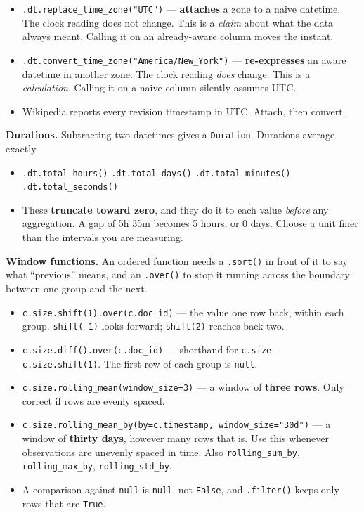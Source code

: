 \documentclass[11pt, a4paper]{article}
\newcommand{\code}[1]{\texttt{#1}}
\begin{document}
\begin{itemize}
  \item \code{.dt.replace\_time\_zone("UTC")} --- \textbf{attaches} a zone to a naive
        datetime. The clock reading does not change. This is a \textit{claim} about what the
        data always meant. Calling it on an already-aware column moves the instant.
  \item \code{.dt.convert\_time\_zone("America/New\_York")} --- \textbf{re-expresses} an aware
        datetime in another zone. The clock reading \textit{does} change. This is a
        \textit{calculation}. Calling it on a naive column silently assumes UTC.
  \item Wikipedia reports every revision timestamp in UTC. Attach, then convert.
\end{itemize}

\smallskip

\textbf{Durations.}
Subtracting two datetimes gives a \code{Duration}. Durations average exactly.

\begin{itemize}
  \item \code{.dt.total\_hours()} \quad \code{.dt.total\_days()} \quad
        \code{.dt.total\_minutes()} \quad \code{.dt.total\_seconds()}
  \item These \textbf{truncate toward zero}, and they do it to each value \textit{before} any
        aggregation. A gap of 5h 35m becomes 5 hours, or 0 days. Choose a unit finer than the
        intervals you are measuring.
\end{itemize}

\textbf{Window functions.}
An ordered function needs a \code{.sort()} in front of it to say what ``previous'' means, and
an \code{.over()} to stop it running across the boundary between one group and the next.

\begin{itemize}
  \item \code{c.size.shift(1).over(c.doc\_id)} --- the value one row back, within each group.
        \code{shift(-1)} looks forward; \code{shift(2)} reaches back two.
  \item \code{c.size.diff().over(c.doc\_id)} --- shorthand for \code{c.size - c.size.shift(1)}.
        The first row of each group is \code{null}.
  \item \code{c.size.rolling\_mean(window\_size=3)} --- a window of \textbf{three rows}. Only
        correct if rows are evenly spaced.
  \item \code{c.size.rolling\_mean\_by(by=c.timestamp, window\_size="30d")} --- a window of
        \textbf{thirty days}, however many rows that is. Use this whenever observations are
        unevenly spaced in time. Also \code{rolling\_sum\_by}, \code{rolling\_max\_by},
        \code{rolling\_std\_by}.
  \item A comparison against \code{null} is \code{null}, not \code{False}, and
        \code{.filter()} keeps only rows that are \code{True}.
\end{itemize}
\end{document}
